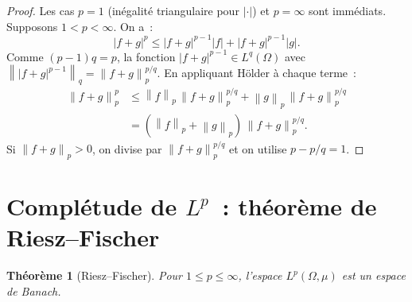 \documentclass[a4paper,12pt]{book}
\newcommand{\norm}[1]{\left\| #1 \right\|}
\newcommand{\abs}[1]{\left| #1 \right|}
\theoremstyle{definition}
\theoremstyle{plain}
\newtheorem{theoreme}[definition]{Théorème}
\theoremstyle{remark}
\begin{document}
\begin{proof}
Les cas $p = 1$ (inégalité triangulaire pour $\abs{\cdot}$) et $p = \infty$ sont
immédiats. Supposons $1 < p < \infty$. On a~:
\[
  \abs{f+g}^p \le \abs{f+g}^{p-1}\abs{f} + \abs{f+g}^{p-1}\abs{g}.
\]
Comme $(p-1)q = p$, la fonction $\abs{f+g}^{p-1} \in L^q(\Omega)$ avec
$\norm{\abs{f+g}^{p-1}}_q = \norm{f+g}_p^{p/q}$. En appliquant Hölder à chaque terme~:
\begin{align*}
  \norm{f+g}_p^p &\le \norm{f}_p\,\norm{f+g}_p^{p/q} + \norm{g}_p\,\norm{f+g}_p^{p/q}\\
  &= (\norm{f}_p + \norm{g}_p)\,\norm{f+g}_p^{p/q}.
\end{align*}
Si $\norm{f+g}_p > 0$, on divise par $\norm{f+g}_p^{p/q}$ et on utilise
$p - p/q = 1$.
\end{proof}

\section{Complétude de $L^p$~: théorème de Riesz--Fischer}

\begin{theoreme}[Riesz--Fischer]
\label{thm:riesz-fischer}
Pour $1 \le p \le \infty$, l'espace $L^p(\Omega, \mu)$ est un espace de Banach.
\end{theoreme}
\end{document}
